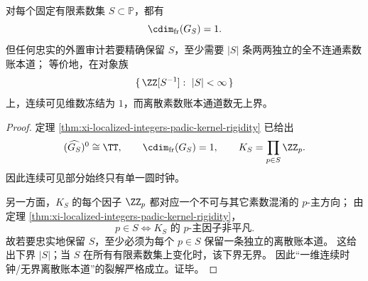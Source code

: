 \begin{corollary}[一维连续时钟与无界离散账本道的裂解]\label{cor:xi-localized-integers-oneclock-unbounded-prime-ledgers}
对每个固定有限素数集 \(S\subset\mathbb P\)，都有
\[
\cdim_{\mathrm{fr}}(G_S)=1.
\]
但任何忠实的外置审计若要精确保留 \(S\)，至少需要 \(|S|\) 条两两独立的全不连通素数账本道；
等价地，在对象族
\[
\{\,\ZZ[S^{-1}]:\ |S|<\infty\,\}
\]
上，连续可见维数冻结为 \(1\)，而离散素数账本通道数无上界。
\end{corollary}
\begin{proof}
定理 \ref{thm:xi-localized-integers-padic-kernel-rigidity} 已给出
\[
(\widehat{G_S})^0\cong \TT,
\qquad
\cdim_{\mathrm{fr}}(G_S)=1,
\qquad
K_S=\prod_{p\in S}\ZZ_p.
\]
因此连续可见部分始终只有单一圆时钟。

另一方面，\(K_S\) 的每个因子 \(\ZZ_p\) 都对应一个不可与其它素数混淆的 \(p\)-主方向；
由定理 \ref{thm:xi-localized-integers-padic-kernel-rigidity}，
\[
p\in S
\iff
\text{\(K_S\) 的 \(p\)-主因子非平凡}.
\]
故若要忠实地保留 \(S\)，至少必须为每个 \(p\in S\) 保留一条独立的离散账本道。
这给出下界 \(|S|\)；当 \(S\) 在所有有限素数集上变化时，该下界无界。
因此“一维连续时钟/无界离散账本道”的裂解严格成立。证毕。
\end{proof}

\endinput
